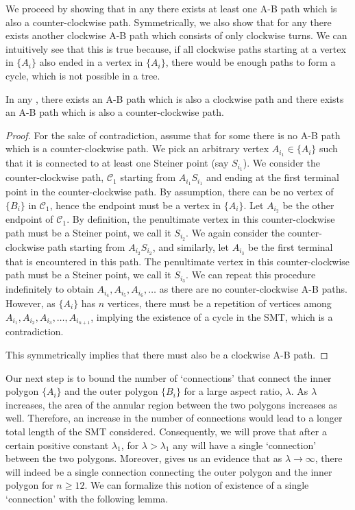 We proceed by showing that in any \smtpoly there exists at least one A-B path which is also a counter-clockwise path. Symmetrically, we also show that for any \smtpoly there exists another clockwise A-B path which consists of only clockwise turns. We can intuitively see that this is true because, if all clockwise paths starting at a vertex in $\{A_i\}$ also ended in a vertex in $\{A_i\}$, there would be enough paths to form a cycle, which is not possible in a tree.

\begin{lemma}\label{left_right_turn_path}
In any \smtpoly, there exists an A-B path which is also a clockwise path and there exists an A-B path which is also a counter-clockwise path.
\end{lemma}
\begin{proof}
    For the sake of contradiction, assume that for some \smtpoly there is no A-B path which is a counter-clockwise path. We pick an arbitrary vertex $A_{i_1} \in \{A_i\}$ such that it is connected to at least one Steiner point (say $S_{i_1}$). We consider the counter-clockwise path, $\mathcal C_1$ starting from $A_{i_1}S_{i_1}$ and ending at the first terminal point in the counter-clockwise path. By assumption, there can be no vertex of $\{B_i\}$ in $\mathcal C_1$, hence the endpoint must be a vertex in $\{A_i\}$. Let $A_{i_2}$ be the other endpoint of $\mathcal C_1$. By definition, the penultimate vertex in this counter-clockwise path must be a Steiner point, we call it $S_{i_2}$. We again consider the counter-clockwise path starting from $A_{i_2}S_{i_2}$, and similarly, let $A_{i_3}$ be the first terminal that is encountered in this path. The penultimate vertex in this counter-clockwise path must be a Steiner point, we call it $S_{i_3}$. We can repeat this procedure indefinitely to obtain $A_{i_4}, A_{i_5}, A_{i_6}, \ldots $ as there are no counter-clockwise A-B paths. However, as $\{A_i\}$ has $n$ vertices, there must be a repetition of vertices among   $A_{i_1}, A_{i_2}, A_{i_3}, \ldots, A_{i_{n+1}}$, implying the existence of a cycle in the SMT, which is a contradiction.

    This symmetrically implies that there must also be a clockwise A-B path. 
\end{proof}

Our next step is to bound the number of `connections' that connect the inner polygon $\{A_i\}$ and the outer polygon $\{B_i\}$ for a large aspect ratio, $\lambda$. As $\lambda$ increases, the area of the annular region between the two polygons increases as well. Therefore, an increase in the number of connections would lead to a longer total length of the SMT considered. Consequently, we will prove that after a certain positive constant $\lambda_1$, for $\lambda > \lambda_1$ any \smtpoly will have a single `connection' between the two polygons. Moreover, \cite{weng1995steiner} gives us an evidence that as $\lambda \rightarrow \infty$, there will indeed be a single connection connecting the outer polygon and the inner polygon for $n \ge 12$. We can formalize this notion of existence of a single `connection' with the following lemma.\\

